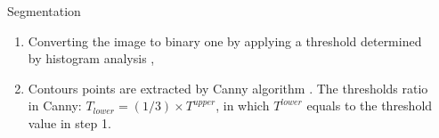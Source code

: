 \documentclass{LaBRI_poster}
\begin{document}
\begin{frame}[t]
\begin{columns}[t]
\end{columns}


\begin{columns}[t]

\begin{column}{\sepwidth}\end{column} %


\begin{column}{\twocolwidth}

\begin{block}{Segmentation}
	\begin{enumerate}
		\item Converting the image to binary one by applying a threshold determined by histogram analysis \cite{leestimating},
		\item Contours points are extracted by Canny algorithm \cite{canny1986computational}. The thresholds ratio in Canny: $T_{lower} = (1/3) \times T^{upper}$, in which $T^{lower}$ equals to the threshold value in step 1.
	\end{enumerate}
\end{block}



\vspace{5pt}


\end{column}
\end{columns}
\end{frame}
\end{document}
